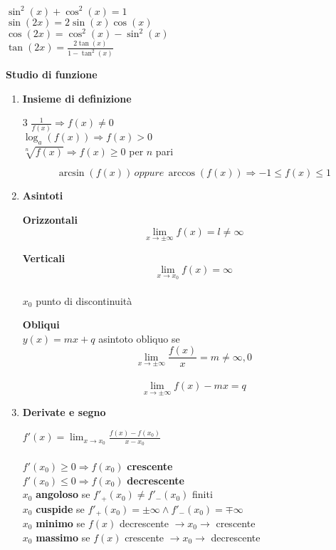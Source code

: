 \documentclass[10pt]{article}
\begin{document}
\begin{multicols}{4}
$\sin^2(x) + \cos^2(x) = 1$\\
$\sin(2x) = 2\sin(x)\cos(x)$\\
$\cos(2x) = \cos^2(x) - \sin^2(x)$\\
$\tan(2x) = \frac{2\tan(x)}{1 - \tan^2(x)} $
\end{multicols}
\pagebreak
\maketitle
\textbf{Studio di funzione}
\begin{enumerate}
	\item \textbf{Insieme di definizione}
	\begin{multicols} {3}
		$\frac{1}{f(x)} \Rightarrow f(x) \neq 0$\\
		$\log_a(f(x)) \Rightarrow f(x) > 0$\\
		$\sqrt[n]{f(x)} \Rightarrow f(x) \geq 0$ per $n$ pari
	\end{multicols}
	$$\arcsin(f(x))\, oppure\, \arccos(f(x)) \Rightarrow -1 \leq f(x) \leq 1$$
	\item \textbf{Asintoti}
	\begin{multicols}{3}
		\textbf{Orizzontali}\\
		$$\lim_{x\to\pm\infty} f(x) = l \neq \infty$$
		\columnbreak
		
		\textbf{Verticali}\\
		$$\lim_{x\to x_0} f(x) = \infty$$\\
		$x_0$ punto di discontinuità
		\columnbreak
		
		\textbf{Obliqui}\\
		$y(x) = mx + q$ asintoto obliquo se\\
		$$\lim_{x\to\pm\infty} \frac{f(x)}{x} = m \neq \infty, 0$$\\
		$$\lim_{x\to\pm\infty} f(x) - mx = q$$
	\end{multicols}
	\item \textbf{Derivate e segno}
	\begin{multicols}{2}
		$f'(x) = \lim_{x\to x_0} \frac{f(x) - f(x_0)}{x - x_0}$\\\\
		$f'(x_0) \geq 0 \Rightarrow f(x_0)$ \textbf{crescente}\\
		$f'(x_0) \leq 0 \Rightarrow f(x_0)$ \textbf{decrescente}\\
		$x_0$ \textbf{angoloso} se $f'_+(x_0) \neq f'_-(x_0)$ finiti\\
		$x_0$ \textbf{cuspide} se $f'_+(x_0) = \pm\infty \wedge f'_-(x_0) = \mp\infty$\\
		$x_0$ \textbf{minimo} se $f(x)$ decrescente $\rightarrow x_0 \rightarrow$ crescente\\
		$x_0$ \textbf{massimo} se $f(x)$ crescente $\rightarrow x_0 \rightarrow$ decrescente\\
		\columnbreak
		

\end{multicols}
\end{enumerate}
\end{document}
